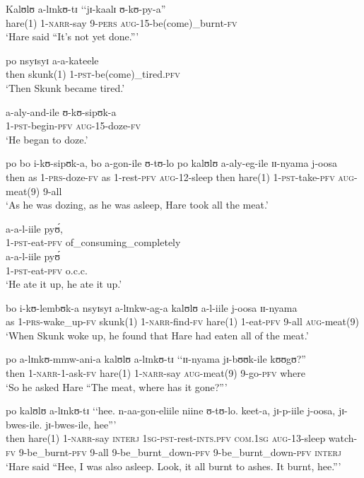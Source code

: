 \begin{exe}
\ex \gll Kalʊlʊ a-lɪnkʊ-tɪ \lq\lq jɪ-kaalɪ ʊ-kʊ-py-a''\\
hare(1) 1-\textsc{narr}-say \phantom{\lq\lq}9-\textsc{pers} \textsc{aug}-15-be(come)\_burnt-\textsc{fv}\\
\glt \lq  Hare said ``It's not yet done.''{}'

\ex \gll po nsyɪsyɪ a-a-kateele\\
then skunk(1) 1-\textsc{pst}-be(come)\_tired.\textsc{pfv}\\
\glt \lq Then Skunk became tired.'

\ex \gll a-aly-and-ile ʊ-kʊ-sipʊk-a\\
1-\textsc{pst}-begin-\textsc{pfv} \textsc{aug}-15-doze-\textsc{fv}\\
\glt \lq He began to doze.'

\ex \gll po bo i-kʊ-sipʊk-a, bo a-gon-ile ʊ-tʊ-lo po kalʊlʊ a-aly-eg-ile ɪɪ-nyama j-oosa\\
then as 1-\textsc{prs}-doze-\textsc{fv} as 1-rest-\textsc{pfv} \textsc{aug}-12-sleep then hare(1) 1-\textsc{pst}-take-\textsc{pfv} \textsc{aug}-meat(9) 9-all\\
\glt `‎‎As he was dozing, as he was asleep, Hare took all the meat.'

\ex\gll a-a-l-iile pyʊ́,\\
1-\textsc{pst}-eat-\textsc{pfv} of\_consuming\_completely\\

\ex\gll a-a-l-iile pyʊ́\\
 1-\textsc{pst}-eat-\textsc{pfv} o.c.c.\\
\glt `He ate it up, he ate it up.'

\ex\gll bo i-kʊ-lembʊk-a nsyɪsyɪ a-lɪnkw-ag-a kalʊlʊ a-l-iile j-oosa ɪɪ-nyama\\
as 1-\textsc{prs}-wake\_up-\textsc{fv} skunk(1) 1-\textsc{narr}-find-\textsc{fv} hare(1) 1-eat-\textsc{pfv} 9-all \textsc{aug}-meat(9)\\
\glt `When Skunk woke up, he found that Hare had eaten all of the meat.'

\ex\gll po a-lɪnkʊ-mmw-ani-a kalʊlʊ a-lɪnkʊ-tɪ \lq\lq ɪɪ-nyama jɪ-bʊʊk-ile kʊʊgʊ?''\\
then 1-\textsc{narr}-1-ask-\textsc{fv} hare(1) 1-\textsc{narr}-say \phantom{\lq\lq}\textsc{aug}-meat(9) 9-go-\textsc{pfv} where\\
\glt `So he asked Hare ``The meat, where has it gone?''{}'

\ex\gll po kalʊlʊ a-lɪnkʊ-tɪ \lq\lq hee. n-aa-gon-eliile niine ʊ-tʊ-lo. keet-a, jɪ-p-iile j-oosa, jɪ-bwes-ile. jɪ-bwes-ile, hee\textup{''}'\\
then hare(1) 1-\textsc{narr}-say \phantom{\lq\lq}\textsc{interj} \textsc{1sg}-\textsc{pst}-rest-\textsc{ints.pfv} \textsc{com.1sg} \textsc{aug}-13-sleep watch-\textsc{fv} 9-be\_burnt-\textsc{pfv} 9-all 9-be\_burnt\_down-\textsc{pfv} 9-be\_burnt\_down-\textsc{pfv} \textsc{interj}\\
\glt `Hare said ``Hee, I was also asleep. Look, it all burnt to ashes. It burnt, hee.''{}'


\end{exe}
